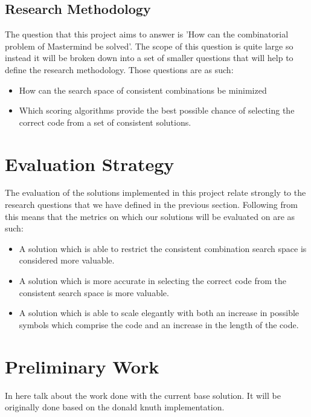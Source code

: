 \documentclass[12pt]{article}  %
\theoremstyle{definition}
\theoremstyle{remark}
\begin{document}
\subsection {Research Methodology}
The question that this project aims to answer is 'How can the combinatorial problem of Mastermind be solved'. The scope of this question is quite large so instead it will be broken down into a set of smaller questions that will help to define the research methodology. Those questions are as such:

\begin {itemize}
	\item {How can the search space of consistent combinations be minimized}
	\item {Which scoring algorithms provide the best possible chance of selecting the correct code from a set of consistent solutions.}
\end {itemize}

\newpage                     %
\section{Evaluation Strategy}\label{ss:back}

The evaluation of the solutions implemented in this project relate strongly to the research questions that we have defined in the previous section. Following from this means that the metrics on which our solutions will be evaluated on are as such:
\begin {itemize}
	\item {A solution which is able to restrict the consistent combination search space is considered more valuable.}
	\item {A solution which is more accurate in selecting the correct code from the consistent search space is more valuable.}
	\item {A solution which is able to scale elegantly with both an increase in possible symbols which comprise the code and an increase in the length of the code.}
\end{itemize}

\newpage
\section {Preliminary Work}

In here talk about the work done with the current base solution. It will be originally done based on the donald knuth implementation.
\end{document}
